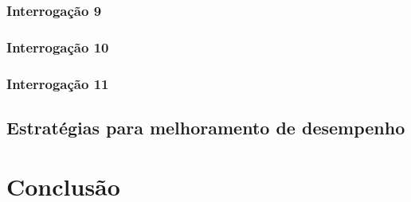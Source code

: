 \documentclass[10pt]{report}
\begin{document}
\subsection{Interrogação 9}

\subsection{Interrogação 10}

\subsection{Interrogação 11}

\section{Estratégias para melhoramento de desempenho}


\chapter{Conclusão}

\label{sec:conclusao}
\end{document}
